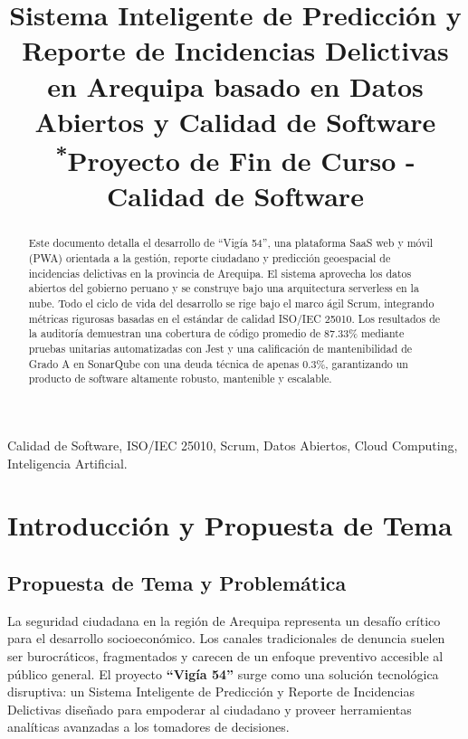 \documentclass[conference]{IEEEtran}
\begin{document}
\title{Sistema Inteligente de Predicción y Reporte de Incidencias Delictivas en Arequipa basado en Datos Abiertos y Calidad de Software\\
{\footnotesize \textsuperscript{*}Proyecto de Fin de Curso - Calidad de Software}}

\author{
}

\maketitle

\begin{abstract}
Este documento detalla el desarrollo de ``Vigía 54'', una plataforma SaaS web y móvil (PWA) orientada a la gestión, reporte ciudadano y predicción geoespacial de incidencias delictivas en la provincia de Arequipa. El sistema aprovecha los datos abiertos del gobierno peruano y se construye bajo una arquitectura serverless en la nube. Todo el ciclo de vida del desarrollo se rige bajo el marco ágil Scrum, integrando métricas rigurosas basadas en el estándar de calidad ISO/IEC 25010. Los resultados de la auditoría demuestran una cobertura de código promedio de 87.33\% mediante pruebas unitarias automatizadas con Jest y una calificación de mantenibilidad de Grado A en SonarQube con una deuda técnica de apenas 0.3\%, garantizando un producto de software altamente robusto, mantenible y escalable.
\end{abstract}

\begin{IEEEkeywords}
Calidad de Software, ISO/IEC 25010, Scrum, Datos Abiertos, Cloud Computing, Inteligencia Artificial.
\end{IEEEkeywords}

\section{Introducción y Propuesta de Tema}
\subsection{Propuesta de Tema y Problemática}
La seguridad ciudadana en la región de Arequipa representa un desafío crítico para el desarrollo socioeconómico. Los canales tradicionales de denuncia suelen ser burocráticos, fragmentados y carecen de un enfoque preventivo accesible al público general. El proyecto \textbf{``Vigía 54''} surge como una solución tecnológica disruptiva: un Sistema Inteligente de Predicción y Reporte de Incidencias Delictivas diseñado para empoderar al ciudadano y proveer herramientas analíticas avanzadas a los tomadores de decisiones.
\end{document}
